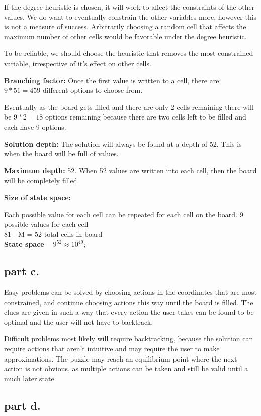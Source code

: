 If the degree heuristic is chosen, it will work to affect the constraints of the other values. We do want to eventually constrain the other variables more, however this is not a measure of success. Arbitrarily choosing a random cell that affects the maximum number of other cells would be favorable under the degree heuristic.

To be reliable, we should choose the heuristic that removes the most constrained variable, irrespective of it's effect on other cells.

\textbf{Branching factor:} 
Once the first value is written to a cell, there are: $9 * 51 = 459$ different options to choose from. 

Eventually as the board gets filled and there are only 2 cells remaining there will be $9 * 2 = 18$ options remaining because there are two cells left to be filled and each have 9 options.

\textbf{Solution depth:} 
The solution will always be found at a depth of 52. This is when the board will be full of values.

\textbf{Maximum depth:} 
52. When 52 values are written into each cell, then the board will be completely filled.

\textbf{Size of state space:}
 
Each possible value for each cell can be repeated for each cell on the board.
9 possible values for each cell \\
81 - M = 52 total cells in board \\
\textbf{State space =$9 ^ {52} \approx 10^{49}$};


\subsection{part c.}
Easy problems can be solved by choosing actions in the coordinates that are most constrained, and continue choosing actions this way until the board is filled. The clues are given in such a way that every action the user takes can be found to be optimal and the user will not have to backtrack.


Difficult problems most likely will require backtracking, because the solution can require actions that aren't intuitive and may require the user to make approximations. The puzzle may reach an equilibrium point where the next action is not obvious, as multiple actions can be taken and still be valid until a much later state.

\subsection{part d.}

